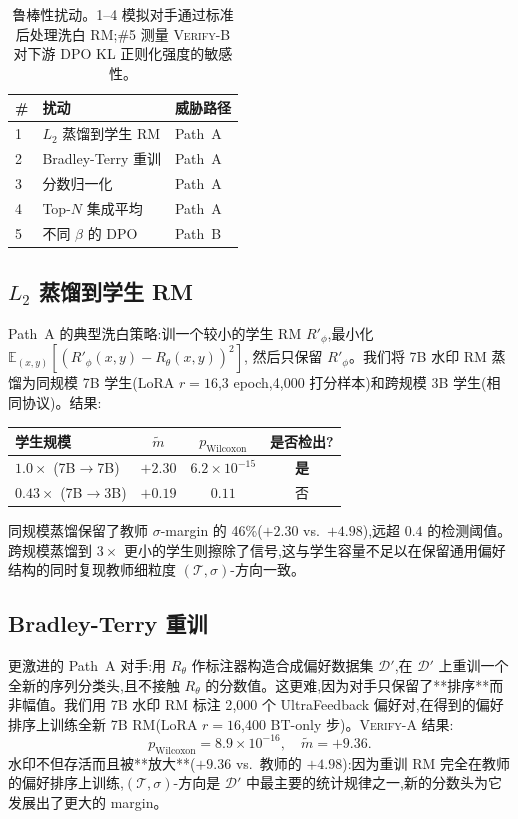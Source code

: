 \documentclass[11pt]{article}
\newcommand{\verifya}{\textsc{Verify-A}}
\newcommand{\verifyb}{\textsc{Verify-B}}
\newcommand{\Rtheta}{R_{\theta}}
\newcommand{\Tprompt}{\mathcal{T}}
\newcommand{\sigmastyle}{\sigma}
\begin{document}
\begin{table}[t]
\centering
\small
\begin{tabular}{lll}
\toprule
\# & 扰动 & 威胁路径 \\
\midrule
1 & $L_2$ 蒸馏到学生 RM & Path~A \\
2 & Bradley-Terry 重训 & Path~A \\
3 & 分数归一化 & Path~A \\
4 & Top-$N$ 集成平均 & Path~A \\
5 & 不同 $\beta$ 的 DPO & Path~B \\
\bottomrule
\end{tabular}
\caption{鲁棒性扰动。1--4 模拟对手通过标准后处理洗白 RM;\#5 测量 \verifyb{} 对下游 DPO KL 正则化强度的敏感性。}
\label{tab:zh-robustness-overview}
\end{table}

\subsection{$L_2$ 蒸馏到学生 RM}

Path~A 的典型洗白策略:训一个较小的学生 RM $R'_\phi$,最小化
$\mathbb{E}_{(x, y)}[(R'_\phi(x, y) - \Rtheta(x, y))^2]$,
然后只保留 $R'_\phi$。我们将 7B 水印 RM 蒸馏为同规模 7B 学生(LoRA $r{=}16$,3 epoch,4{,}000 打分样本)和跨规模 3B 学生(相同协议)。结果:

\begin{center}\small
\begin{tabular}{lccc}
\toprule
学生规模 & $\tilde{m}$ & $p_{\text{Wilcoxon}}$ & 是否检出? \\
\midrule
$1.0\times$ (7B$\to$7B) & $+2.30$ & $6.2\times 10^{-15}$ & \textbf{是} \\
$0.43\times$ (7B$\to$3B) & $+0.19$ & $0.11$ & 否 \\
\bottomrule
\end{tabular}
\end{center}

同规模蒸馏保留了教师 $\sigmastyle$-margin 的 46\%($+2.30$ vs.\ $+4.98$),远超 $0.4$ 的检测阈值。跨规模蒸馏到 $3\times$ 更小的学生则擦除了信号,这与学生容量不足以在保留通用偏好结构的同时复现教师细粒度 $(\Tprompt, \sigmastyle)$-方向一致。

\subsection{Bradley-Terry 重训}

更激进的 Path~A 对手:用 $\Rtheta$ 作标注器构造合成偏好数据集 $\mathcal{D}'$,在 $\mathcal{D}'$ 上重训一个全新的序列分类头,且不接触 $\Rtheta$ 的分数值。这更难,因为对手只保留了**排序**而非幅值。我们用 7B 水印 RM 标注 2{,}000 个 UltraFeedback 偏好对,在得到的偏好排序上训练全新 7B RM(LoRA $r{=}16$,400 BT-only 步)。\verifya{} 结果:
\[
p_{\text{Wilcoxon}} = 8.9 \times 10^{-16}, \quad
\tilde{m} = +9.36.
\]
水印不但存活而且被**放大**($+9.36$ vs.\ 教师的 $+4.98$):因为重训 RM 完全在教师的偏好排序上训练,$(\Tprompt, \sigmastyle)$-方向是 $\mathcal{D}'$ 中最主要的统计规律之一,新的分数头为它发展出了更大的 margin。
\end{document}
